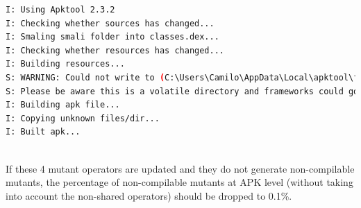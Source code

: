 \begin{minipage}{\textwidth}
	\begin{lstlisting}[language={sh}, label={lst:ikipe}, caption={Example Output of MutAPK for PhotoStream app}, numbers=none]
I: Using Apktool 2.3.2
I: Checking whether sources has changed...
I: Smaling smali folder into classes.dex...
I: Checking whether resources has changed...
I: Building resources...
S: WARNING: Could not write to (C:\Users\Camilo\AppData\Local\apktool\framework), using C:\Users\Camilo\AppData\Local\Temp\ instead...
S: Please be aware this is a volatile directory and frameworks could go missing, please utilize --frame-path if the default storage directory is unavailable
I: Building apk file...
I: Copying unknown files/dir...
I: Built apk...
	\end{lstlisting}
\end{minipage}\\

If these 4 mutant operators are updated and they do not generate non-compilable mutants, the percentage of non-compilable mutants at APK level (without taking into account the non-shared operators) should be dropped to 0.1\%.





